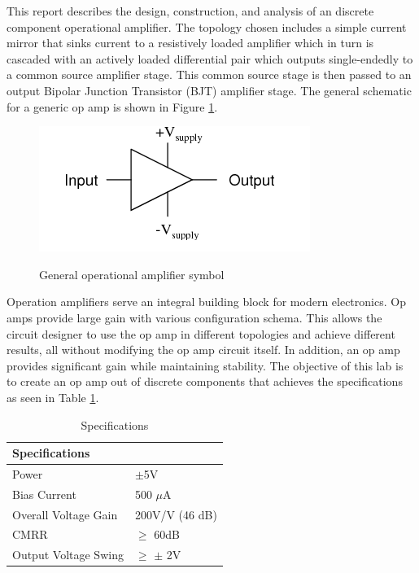 



This report describes the design, construction, and analysis of an discrete component operational amplifier. The topology chosen includes a simple current mirror that sinks current to a resistively loaded amplifier which in turn is cascaded with an actively loaded differential pair which outputs single-endedly to a common source amplifier stage. This common source stage is then passed to an output Bipolar Junction Transistor (BJT) amplifier stage. The general schematic for a generic op amp is shown in Figure \ref{fig:gen_schem}.

\begin{figure}[H]
    \begin{center}
    \includegraphics[scale=.45]{Introduction/genericopamp.png}
    \caption{General operational amplifier symbol \cite{b1}}
    \cite{b1}
    \label{fig:gen_schem}
    \end{center}
    
\end{figure}

Operation amplifiers serve an integral building block for modern electronics. Op amps provide large gain with various configuration schema. This allows the circuit designer to use the op amp in different topologies and achieve different results, all without modifying the op amp circuit itself. In addition, an op amp provides significant gain while maintaining stability. The objective of this lab is to create an op amp out of discrete components that achieves the specifications as seen in Table \ref{tab:labspecs}.


\begin{table}[H]
\centering
\caption{Specifications}
\label{tab:labspecs}
\begin{tabular}{|l|l|}
\hline
\textbf{Specifications} &                 \\ \hline
Power                   & $\pm$5V         \\ \hline
Bias Current            & 500 $\mu$A      \\ \hline
Overall Voltage Gain    & 200V/V (46 dB)  \\ \hline
CMRR                    & $\geq$ 60dB     \\ \hline
Output Voltage Swing    & $\geq$ $\pm$ 2V \\ \hline
\end{tabular}
\end{table}

